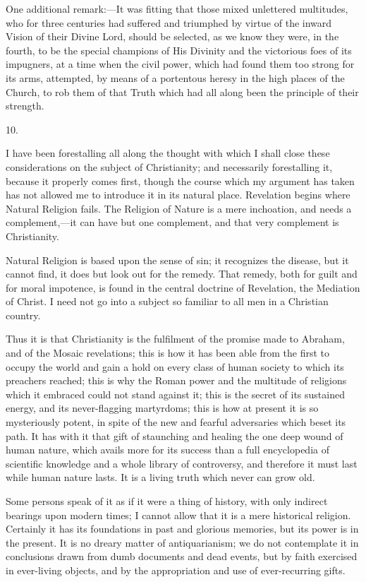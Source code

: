 One additional remark:—It was fitting that those mixed unlettered
multitudes, who for three centuries had suffered and triumphed by
virtue of the inward Vision of their Divine Lord, should be selected,
as we know they were, in the fourth, to be the special champions of
His Divinity and the victorious foes of its impugners, at a time when
the civil power, which had found them too strong for its arms,
attempted, by means of a portentous heresy in the high places of the
Church, to rob them of that Truth which had all along been the
principle of their strength.

10.

I have been forestalling all along the thought with which I shall
close these considerations on the subject of Christianity; and
necessarily forestalling it, because it properly comes first, though
the course which my argument has taken has not allowed me to introduce
it in its natural place. Revelation begins where Natural
Religion fails. The Religion of Nature is a mere inchoation, and needs
a complement,—it can have but one complement, and that very
complement is Christianity.

Natural Religion is based upon the sense of sin; it recognizes the
disease, but it cannot find, it does but look out for the remedy. That
remedy, both for guilt and for moral impotence, is found in the
central doctrine of Revelation, the Mediation of Christ. I need not go
into a subject so familiar to all men in a Christian country.

Thus it is that Christianity is the fulfilment of the promise made
to Abraham, and of the Mosaic revelations; this is how it has been
able from the first to occupy the world and gain a hold on every class
of human society to which its preachers reached; this is why the Roman
power and the multitude of religions which it embraced could not stand
against it; this is the secret of its sustained energy, and its
never-flagging martyrdoms; this is how at present it is so
mysteriously potent, in spite of the new and fearful adversaries which
beset its path. It has with it that gift of staunching and healing the
one deep wound of human nature, which avails more for its success than
a full encyclopedia of scientific knowledge and a whole library of
controversy, and therefore it must last while human nature lasts. It
is a living truth which never can grow old.

Some persons speak of it as if it were a thing of history, with
only indirect bearings upon modern times; I cannot allow that it
is a mere historical religion. Certainly it has its foundations in
past and glorious memories, but its power is in the present. It is no
dreary matter of antiquarianism; we do not contemplate it in
conclusions drawn from dumb documents and dead events, but by faith
exercised in ever-living objects, and by the appropriation and use of
ever-recurring gifts.

